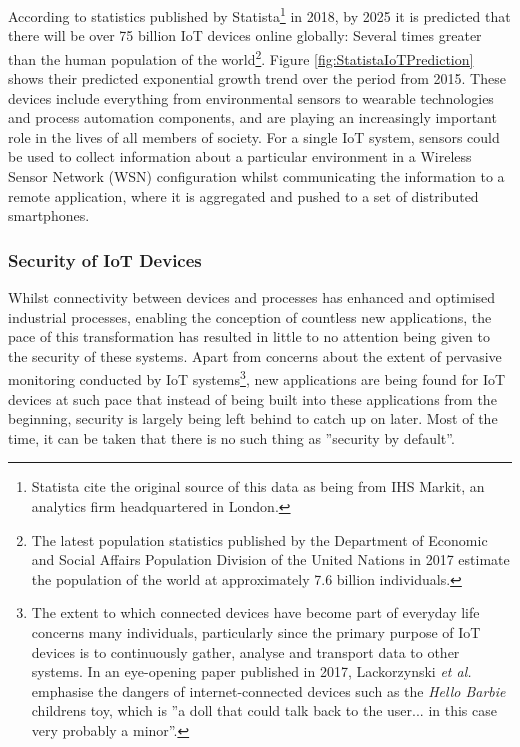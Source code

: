 According to statistics published by Statista\footnote{Statista cite the original source of this data as being from IHS Markit, an analytics firm headquartered in London.} in 2018, \cite{StatisticIoTStatistics} by 2025 it is predicted that there will be over 75 billion IoT devices online globally: Several times greater than the human population of the world\footnote{The latest population statistics published by the Department of Economic and Social Affairs Population Division of the United Nations in 2017 \cite{UNWorldPopulation} estimate the population of the world at approximately 7.6 billion individuals.}. Figure \ref{fig:StatistaIoTPrediction} shows their predicted exponential growth trend over the period from 2015. These devices include everything from environmental sensors to wearable technologies and process automation components, and are playing an increasingly important role in the lives of all members of society.  For a single IoT system, sensors could be used to collect information about a particular environment in a Wireless Sensor Network (WSN) configuration whilst communicating the information to a remote application, where it is aggregated and pushed to a set of distributed smartphones.


	
 \subsubsection{Security of IoT Devices}
Whilst connectivity between devices and processes has enhanced and optimised industrial processes, enabling the conception of countless new applications, the pace of this transformation has resulted in little to no attention being given to the security of these systems. Apart from concerns about the extent of pervasive monitoring conducted by IoT systems\footnote{The extent to which connected devices have become part of everyday life concerns many individuals, particularly since the primary purpose of IoT devices is to continuously gather, analyse and transport data to other systems. In an eye-opening paper published in 2017, \cite{7948540} Lackorzynski \textit{et al.} emphasise the dangers of internet-connected devices such as the \textit{Hello Barbie} childrens toy, which is ''a doll that could talk back to the user... in this case very probably a minor''. }, new applications are being found for IoT devices at such pace that instead of being built into these applications from the beginning, security is largely being left behind to catch up on later. Most of the time, it can be taken that there is no such thing as ''security by default''.

